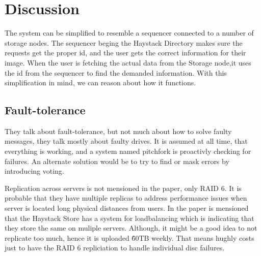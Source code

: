 \section{Discussion}
The system can be simplified to resemble a sequencer connected to a number of storage nodes.
The sequencer beging the Haystack Directory makes sure the requests get the 
proper id, and the user gets the correct information for their image. When the user
is fetching the actual data from the Storage node,it uses the id from the sequencer
to find the demanded information. With this simplification in mind, we can reason about how it
functions.
\subsection{Fault-tolerance}
They talk about fault-tolerance, but not much about how to solve faulty messages, they talk
 mostly about faulty drives. It is assumed at all time, that everything is working, and a system 
named pitchfork is proactivly checking for failures. An alternate solution would be to 
try to find or mask errors by introducing voting.

Replication across servers is not mensioned in the paper, only RAID 6. It is probable that
they have multiple replicas to address performance issues when server is located
long physical distances from users. In the paper is mensioned that the Haystack Store 
has a system for loadbalancing which is indicating that they store the same on muliple servers. 
Although, it might be a good idea to not replicate too much, hence it is uploaded
\~60TB weekly. That means hughly costs just to have the RAID 6 repliciation to handle
individual disc failures.


